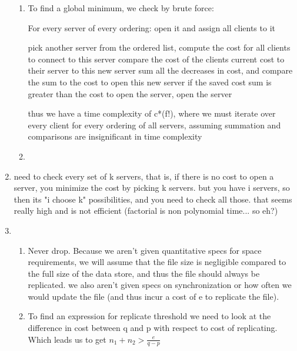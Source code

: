 \documentclass{article}
\begin{document}
\begin{enumerate}
	\begin{enumerate}

		\item 

To find a global minimum, we check by brute force:

For every server of every ordering:
	open it and assign all clients to it
	
	pick another server from the ordered list, 
		compute the cost for all clients to connect to this server
		compare the cost of the clients current cost to their server to this new server
		sum all the decreases in cost, and compare the sum to the cost to open this new server
		if the saved cost sum is greater than the cost to open the server, open the server

thus we have a time complexity of c*(f!), where we must iterate over every client for every ordering of all servers, assuming summation and comparisons are insignificant in time complexity

		\item



	\end{enumerate}

	\item  

need to check every set of k servers, that is, if there is no cost to open a server, you minimize the cost by picking k servers. but you have i servers, so then its "i choose k" possibilities, and you need to check all those. that seems really high and is not efficient (factorial is non polynomial time... so eh?)

	\item  

	\begin{enumerate}

		\item 

Never drop. Because we aren't given quantitative specs for space requirements, we will assume that the file size is negligible compared to the full size of the data store, and thus the file should always be replicated. we also aren't given specs on synchronization or how often we would update the file (and thus incur a cost of e to replicate the file).

		\item 
To find an expression for replicate threshold we need to look at the difference in cost between q and p with respect to cost of replicating. Which leads us to get \(n_1+n_2>\frac{e}{q-p} \)


\end{enumerate}
\end{enumerate}
\end{document}
